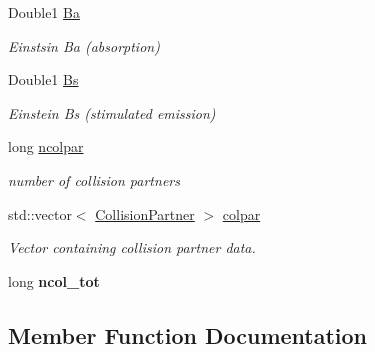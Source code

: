 \begin{DoxyCompactItemize}
\mbox{\label{structLinedata_a2a0a095bd74c0b4333307c8f73f74662}} 
Double1 \mbox{\hyperlink{structLinedata_a2a0a095bd74c0b4333307c8f73f74662}{Ba}}
\begin{DoxyCompactList}\small\item\em Einstsin Ba (absorption) \end{DoxyCompactList}\item 
\mbox{\label{structLinedata_ab97d931f484320c16c7d9fa8bf67bde3}} 
Double1 \mbox{\hyperlink{structLinedata_ab97d931f484320c16c7d9fa8bf67bde3}{Bs}}
\begin{DoxyCompactList}\small\item\em Einstein Bs (stimulated emission) \end{DoxyCompactList}\item 
\mbox{\label{structLinedata_a82744cd6d4c56bb2b4b9d53c3f574560}} 
long \mbox{\hyperlink{structLinedata_a82744cd6d4c56bb2b4b9d53c3f574560}{ncolpar}}
\begin{DoxyCompactList}\small\item\em number of collision partners \end{DoxyCompactList}\item 
\mbox{\label{structLinedata_a89bee23ead1d6b1f80106c39d802e5d2}} 
std\+::vector$<$ \mbox{\hyperlink{structCollisionPartner}{Collision\+Partner}} $>$ \mbox{\hyperlink{structLinedata_a89bee23ead1d6b1f80106c39d802e5d2}{colpar}}
\begin{DoxyCompactList}\small\item\em Vector containing collision partner data. \end{DoxyCompactList}\item 
\mbox{\label{structLinedata_a492753995a2c3bf15b6705764746f199}} 
long {\bfseries ncol\+\_\+tot}
\end{DoxyCompactItemize}


\subsection{Member Function Documentation}
\mbox{\label{structLinedata_af4cb38e89e417f7016608b7084223364}} 
